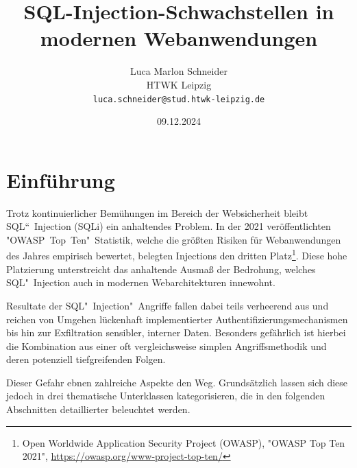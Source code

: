 \documentclass[a4paper,10pt,parskip,twocolumn]{article}
\title{SQL-Injection-Schwachstellen in modernen Webanwendungen}
\author{
	\Large Luca Marlon Schneider \\[2mm]
	\normalsize HTWK Leipzig \\
	\texttt{luca.schneider@stud.htwk-leipzig.de}
}
\date{09.12.2024}
\begin{document}


\section{Einführung}

    Trotz kontinuierlicher Bemühungen im Bereich der Websicherheit bleibt SQL“~Injection (SQLi) ein anhaltendes Problem. In der 2021 veröffentlichten "OWASP~Top~Ten"\ Statistik, welche die größten Risiken für Webanwendungen des Jahres empirisch bewertet, belegten Injections den dritten Platz\footnote{Open Worldwide Application Security Project (OWASP), "OWASP Top Ten 2021", \url{https://owasp.org/www-project-top-ten/}}. Diese hohe Platzierung unterstreicht das anhaltende Ausmaß der Bedrohung, welches SQL"~Injection auch in modernen Webarchitekturen innewohnt.\par
    Resultate der SQL"~Injection"~Angriffe fallen dabei teils verheerend aus und reichen von Umgehen 
    lückenhaft implementierter Authentifizierungsmechanismen bis hin zur Exfiltration sensibler, interner Daten. Besonders gefährlich ist hierbei die Kombination aus einer oft vergleichsweise simplen Angriffsmethodik und deren potenziell tiefgreifenden Folgen.\par
    Dieser Gefahr ebnen zahlreiche Aspekte den Weg. Grundsätzlich lassen sich diese jedoch in drei thematische Unterklassen kategorisieren, die in den folgenden Abschnitten detaillierter beleuchtet werden.
\end{document}
